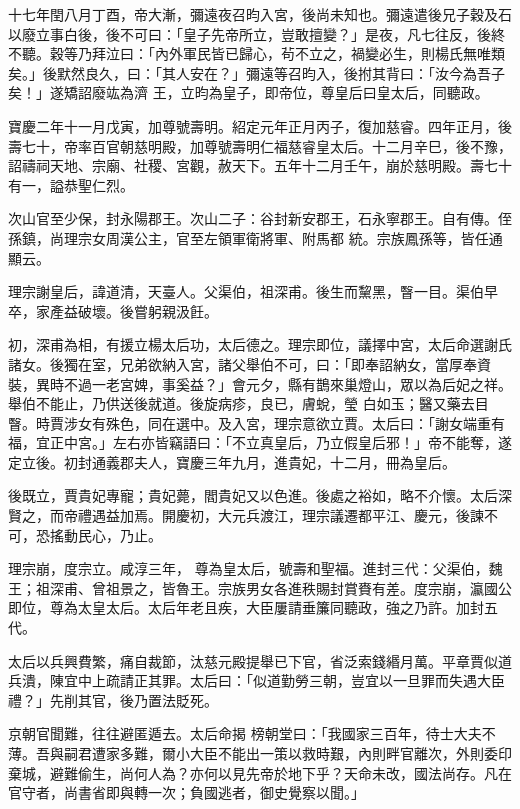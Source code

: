 \begin{pinyinscope}
 十七年閏八月丁酉，帝大漸，彌遠夜召昀入宮，後尚未知也。彌遠遣後兄子穀及石以廢立事白後，後不可曰：「皇子先帝所立，豈敢擅變？」是夜，凡七往反，後終不聽。穀等乃拜泣曰：「內外軍民皆已歸心，茍不立之，禍變必生，則楊氏無唯類矣。」後默然良久，曰：「其人安在？」彌遠等召昀入，後拊其背曰：「汝今為吾子矣！」遂矯詔廢竑為濟
 王，立昀為皇子，即帝位，尊皇后曰皇太后，同聽政。



 寶慶二年十一月戊寅，加尊號壽明。紹定元年正月丙子，復加慈睿。四年正月，後壽七十，帝率百官朝慈明殿，加尊號壽明仁福慈睿皇太后。十二月辛巳，後不豫，詔禱祠天地、宗廟、社稷、宮觀，赦天下。五年十二月壬午，崩於慈明殿。壽七十有一，謚恭聖仁烈。



 次山官至少保，封永陽郡王。次山二子：谷封新安郡王，石永寧郡王。自有傳。侄孫鎮，尚理宗女周漢公主，官至左領軍衛將軍、附馬都
 統。宗族鳳孫等，皆任通顯云。



 理宗謝皇后，諱道清，天臺人。父渠伯，祖深甫。後生而黧黑，瞖一目。渠伯早卒，家產益破壞。後嘗躬親汲飪。



 初，深甫為相，有援立楊太后功，太后德之。理宗即位，議擇中宮，太后命選謝氏諸女。後獨在室，兄弟欲納入宮，諸父舉伯不可，曰：「即奉詔納女，當厚奉資裝，異時不過一老宮婢，事奚益？」會元夕，縣有鵲來巢燈山，眾以為后妃之祥。舉伯不能止，乃供送後就道。後旋病疹，良已，膚蛻，瑩
 白如玉；醫又藥去目瞖。時賈涉女有殊色，同在選中。及入宮，理宗意欲立賈。太后曰：「謝女端重有福，宜正中宮。」左右亦皆竊語曰：「不立真皇后，乃立假皇后邪！」帝不能奪，遂定立後。初封通義郡夫人，寶慶三年九月，進貴妃，十二月，冊為皇后。



 後既立，賈貴妃專寵；貴妃薨，閻貴妃又以色進。後處之裕如，略不介懷。太后深賢之，而帝禮遇益加焉。開慶初，大元兵渡江，理宗議遷都平江、慶元，後諫不可，恐搖動民心，乃止。



 理宗崩，度宗立。咸淳三年，
 尊為皇太后，號壽和聖福。進封三代：父渠伯，魏王；祖深甫、曾祖景之，皆魯王。宗族男女各進秩賜封賞賚有差。度宗崩，瀛國公即位，尊為太皇太后。太后年老且疾，大臣屢請垂簾同聽政，強之乃許。加封五代。



 太后以兵興費繁，痛自裁節，汰慈元殿提舉已下官，省泛索錢緡月萬。平章賈似道兵潰，陳宜中上疏請正其罪。太后曰：「似道勤勞三朝，豈宜以一旦罪而失遇大臣禮？」先削其官，後乃置法貶死。



 京朝官聞難，往往避匿遁去。太后命揭
 榜朝堂曰：「我國家三百年，待士大夫不薄。吾與嗣君遭家多難，爾小大臣不能出一策以救時艱，內則畔官離次，外則委印棄城，避難偷生，尚何人為？亦何以見先帝於地下乎？天命未改，國法尚存。凡在官守者，尚書省即與轉一次；負國逃者，御史覺察以聞。」




\end{pinyinscope}
